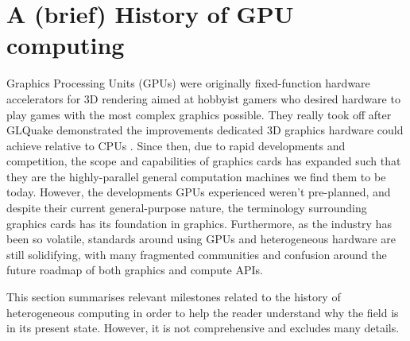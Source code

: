 \documentclass[a4paper,12pt,twoside,openright]{report}
\begin{document}


\section{A (brief) History of GPU computing}

\label{sec:history_gpu}

Graphics Processing Units (GPUs) were originally fixed-function hardware
accelerators for 3D rendering aimed at hobbyist gamers who desired hardware to
play games with the most complex graphics possible. They really took off after
GLQuake demonstrated the improvements dedicated 3D graphics hardware could
achieve relative to CPUs \cite{GLQuake}. Since then, due to rapid developments
and competition, the scope and capabilities of graphics cards has expanded such
that they are the highly-parallel general computation machines we find them to
be today. However, the developments GPUs experienced weren't pre-planned, and
despite their current general-purpose nature, the terminology surrounding
graphics cards has its foundation in graphics. Furthermore, as the industry has
been so volatile, standards around using GPUs and heterogeneous hardware are
still solidifying, with many fragmented communities and confusion around the
future roadmap of both graphics and compute APIs.

This section summarises relevant milestones related to the history of
heterogeneous computing in order to help the reader understand why the field is
in its present state. However, it is not comprehensive and excludes many
details.

\end{document}
